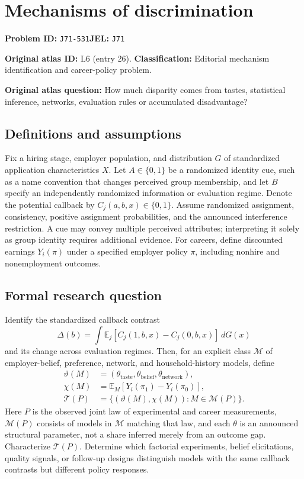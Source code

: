 \documentclass[11pt,a4paper]{article}
\begin{document}
\section*{Mechanisms of discrimination}
\textbf{Problem ID:} \texttt{J71-531}\quad \textbf{JEL:} \texttt{J71}\par
\label{problem:OP-0026}
\label{atlas:prob:L6}
\noindent\textbf{Original atlas ID:} L6 (entry 26). \textbf{Classification:} Editorial mechanism identification and career-policy problem.

\noindent\textbf{Original atlas question:} How much disparity comes from tastes, statistical inference, networks, evaluation rules or accumulated disadvantage?

\subsection*{Definitions and assumptions}
Fix a hiring stage, employer population, and distribution $G$ of standardized application characteristics $X$. Let $A\in\{0,1\}$ be a randomized identity cue, such as a name convention that changes perceived group membership, and let $B$ specify an independently randomized information or evaluation regime. Denote the potential callback by $C_j(a,b,x)\in\{0,1\}$. Assume randomized assignment, consistency, positive assignment probabilities, and the announced interference restriction. A cue may convey multiple perceived attributes; interpreting it solely as group identity requires additional evidence. For careers, define discounted earnings $Y_i(\pi)$ under a specified employer policy $\pi$, including nonhire and nonemployment outcomes.
\subsection*{Formal research question}
Identify the standardized callback contrast
\[
 \Delta(b)=\int \mathbb E_j[C_j(1,b,x)-C_j(0,b,x)]\,dG(x)
\]
and its change across evaluation regimes. Then, for an explicit class $\mathcal M$ of employer-belief, preference, network, and household-history models, define
\begin{align*}
 \vartheta(M)&=(\theta_{\mathrm{taste}},\theta_{\mathrm{belief}},\theta_{\mathrm{network}}),\\
 \chi(M)&=\mathbb E_M[Y_i(\pi_1)-Y_i(\pi_0)],\\
 \mathcal T(P)&=\{(\vartheta(M),\chi(M)):M\in\mathcal M(P)\}.
\end{align*}
Here $P$ is the observed joint law of experimental and career measurements, $\mathcal M(P)$ consists of models in $\mathcal M$ matching that law, and each $\theta$ is an announced structural parameter, not a share inferred merely from an outcome gap. Characterize $\mathcal T(P)$. Determine which factorial experiments, belief elicitations, quality signals, or follow-up designs distinguish models with the same callback contrasts but different policy responses.
\end{document}
